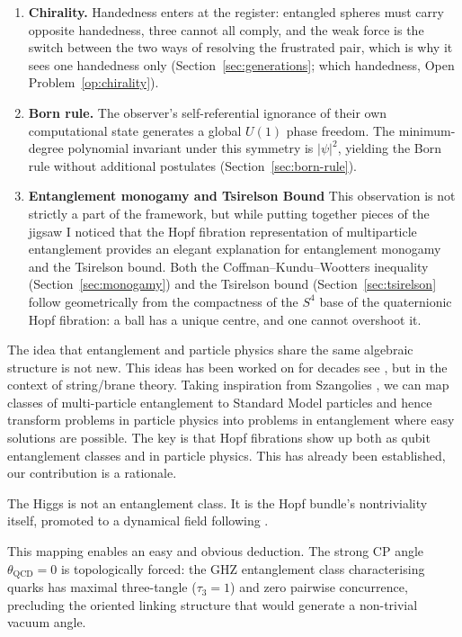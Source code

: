 \documentclass{article}
\theoremstyle{plain}
\theoremstyle{definition}
\theoremstyle{remark}\newtheorem*{remark}{Remark}
\begin{document}
\begin{enumerate}
\item \textbf{Chirality.} Handedness enters at the register: entangled spheres must carry
opposite handedness, three cannot all comply, and the weak force is the switch between the two
ways of resolving the frustrated pair, which is why it sees one handedness only
(Section~\ref{sec:generations}; which handedness, Open Problem~\ref{op:chirality}).

\item \textbf{Born rule.} The observer's self-referential ignorance of their own computational
state generates a global $U(1)$ phase freedom. The minimum-degree polynomial invariant under
this symmetry is $|\psi|^2$, yielding the Born rule without additional postulates
(Section~\ref{sec:born-rule}).

\item \textbf{Entanglement monogamy and Tsirelson Bound} This observation is not strictly a part
of the framework, but while putting together pieces of the jigsaw I noticed that the Hopf
fibration representation of multiparticle entanglement provides an elegant explanation for
entanglement monogamy and the Tsirelson bound. Both the Coffman--Kundu--Wootters inequality
(Section~\ref{sec:monogamy}) and the Tsirelson bound (Section~\ref{sec:tsirelson} follow
geometrically from the compactness of the $S^4$ base of the quaternionic Hopf fibration: a ball
has a unique centre, and one cannot overshoot it.
\end{enumerate}



The idea that entanglement and particle physics share the same algebraic structure is not new.
This ideas has been worked on for decades see \autocite{borsten2009blackholes}, but in the
context of string/brane theory. Taking inspiration from Szangolies
\autocite{szangolies2025standardmodel}, we can map classes of multi-particle entanglement to
Standard Model particles and hence transform problems in particle physics into problems in
entanglement where easy solutions are possible. The key is that Hopf fibrations show up both as
qubit entanglement classes and in particle physics. This has already been established, our
contribution is a rationale.

The Higgs is not an entanglement class. It is the Hopf bundle's nontriviality itself, promoted
to a dynamical field following
\autocite{szangolies2025standardmodel, finkelstein_1962, finkelstein_1963}.

This mapping enables an easy and obvious deduction. The strong CP angle
$\theta_{\mathrm{QCD}} = 0$ is topologically forced: the GHZ entanglement class characterising
quarks has maximal three-tangle ($\tau_3 = 1$) and zero pairwise concurrence, precluding the
oriented linking structure that would generate a non-trivial vacuum angle.
\end{document}
